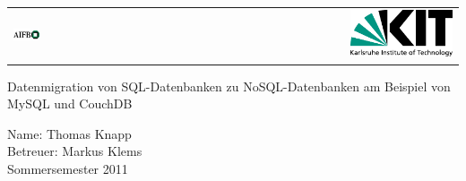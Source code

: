 \begin{titlepage}


\begin{center}
	\begin{tabular}[\textwidth]{lr}	
	
	\includegraphics[width=0.3\textwidth]{figures/logoAIFB.png}
	 &
	 \includegraphics[width=0.3\textwidth]{figures/KITLogo_RGB.pdf}	
	 
	\end{tabular}
\end{center}
	

\vspace{4cm}

\begin{center}
\Huge{Datenmigration von SQL-Datenbanken zu  NoSQL-Datenbanken am Beispiel von MySQL und CouchDB}
\end{center}

\vspace{3cm}

\begin{center}

\Large{
	Name: Thomas Knapp \\
	Betreuer: Markus Klems \\
	
	Sommersemester 2011
	}
	
\end{center}


\end{titlepage}
